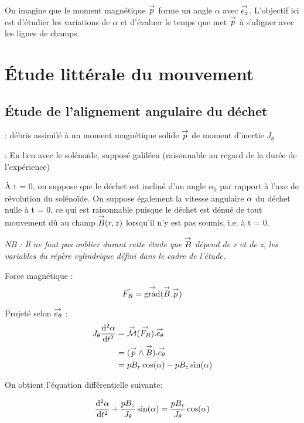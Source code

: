 \documentclass{report}
\begin{document}
On imagine que le moment magnétique $\overset{\to}{p}$ forme un angle $\alpha$ avec $\overset{\to}{e_z}$. L'objectif ici est d'étudier les variations de $\alpha$ et d'évaluer le temps que met $\overset{\to}{p}$ à s'aligner avec les lignes de champs.
\newpage
\section{Étude littérale du mouvement}
\subsection{Étude de l'alignement angulaire du déchet}

: {débris assimilé à un moment magnétique solide $\overset{\to}{p}$ de moment d'inertie $J_\theta$}

: En lien avec le solénoïde, supposé galiléen (raisonnable au regard de la durée de l'expérience)


À t = 0, on suppose que le déchet est incliné d'un angle $\alpha_0$ par rapport à l'axe de révolution du solénoïde. On suppose également la vitesse angulaire $\overset{\cdot}{\alpha}$ du déchet nulle à t = 0, ce qui est raisonnable puisque le déchet est dénué de tout mouvement dû au champ $\overset{\to}{B}(r,z)$ lorsqu'il n'y est pas soumis, i.e. à t = 0.


\emph{NB : Il ne faut pas oublier durant cette étude que $\overset{\to}{B}$ dépend de r et de z, les variables du répère cylindrique défini dans le cadre de l'étude.}

Force magnétique :
$$\vec{F_B} = \overset{\to}{\text{grad}}(\overset{\to}{B}.\overset{\to}{p})$$


Projeté selon $\overset{\to}{e_\theta}$ :
\begin{align*}
J_\theta \frac{\mathrm{d^2}\alpha}{\mathrm{d}t^2} &= \overset{\to}{\mathcal{M}}(\overset{\to}{F_B}) . \overset{\to}{e_\theta} \\
&= (\overset{\to}{p} \wedge \overset{\to}{B}).\overset{\to}{e_\theta}\\
&= pB_r \cos(\alpha) - pB_z\sin(\alpha)
\end{align*}

On obtient l'équation différentielle suivante:
\begin{prettybox}[blue]
$$\frac{\mathrm{d^2}\alpha}{\mathrm{d}t^2} + \frac{pB_z}{J_\theta}\sin(\alpha) = \frac{pB_r}{J_\theta} \cos(\alpha)$$
\end{prettybox}
\end{document}
